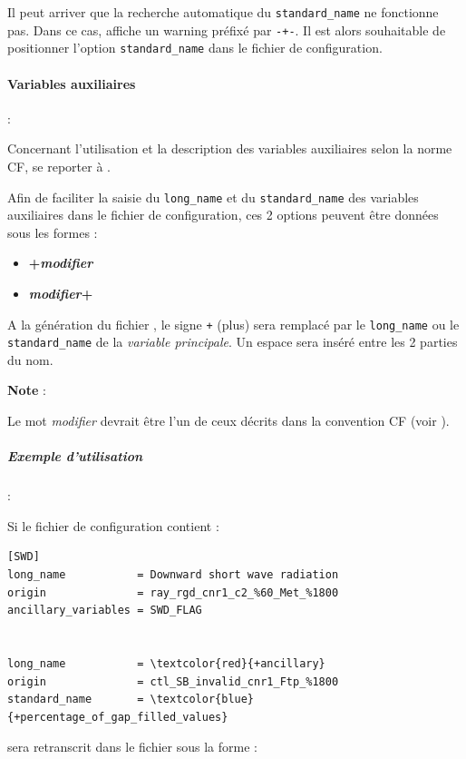   Il peut arriver que la recherche automatique du \texttt{standard\_name} ne
  fonctionne pas. Dans ce cas, \prodcdf affiche un warning préfixé par
  \texttt{-+-}. Il est alors souhaitable de positionner l'option
  \texttt{standard\_name} dans le fichier de configuration.


\paragraph{Variables auxiliaires} : \label{ref:variables_auxiliaires}

Concernant l'utilisation et la description des variables auxiliaires
selon la norme CF, se reporter à .
\medbreak

Afin de faciliter la saisie du \texttt{long\_name} et du
\texttt{standard\_name} des variables auxiliaires dans le fichier de
configuration, ces 2 options peuvent être données sous les formes :

\begin{itemize}
\item
  \textbf{+\textit{modifier}}
\item
  \textbf{\textit{modifier}+}
\end{itemize}

A la génération du fichier \netcdf, le signe \texttt{+}
(plus) sera remplacé par le \texttt{long\_name} ou le
\texttt{standard\_name} de la \textit{variable principale}. Un espace sera
inséré entre les 2 parties du nom.
\medbreak

\textbf{Note} :

Le mot \textit{modifier} devrait être l'un de ceux décrits dans
la convention CF (voir ).
\medbreak

\subparagraph{Exemple d'utilisation} : 

Si le fichier de configuration contient :

\begin{Verbatim}[fontsize=\myfontsize, commandchars=\\\{\}]
[SWD]
long_name           = Downward short wave radiation
origin              = ray_rgd_cnr1_c2_%60_Met_%1800
ancillary_variables = SWD_FLAG


long_name           = \textcolor{red}{+ancillary}
origin              = ctl_SB_invalid_cnr1_Ftp_%1800
standard_name       = \textcolor{blue}{+percentage_of_gap_filled_values}
\end{Verbatim}

sera retranscrit dans le fichier \netcdf sous la forme :


